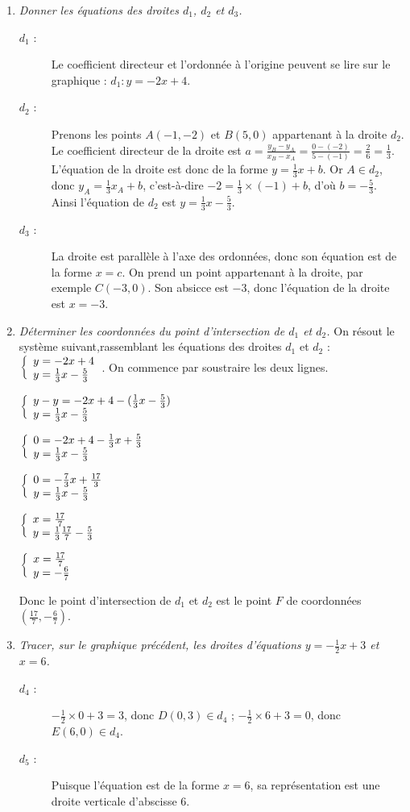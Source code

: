 \documentclass[11pt]{article}
\begin{document}
\begin{exercice}
  \begin{enumerate} 
    \item \emph{Donner les équations des droites $d_1$, $d_2$ et $d_3$. }
      \begin{description}
        \item[$d_1$ :] Le coefficient directeur et l'ordonnée à l'origine peuvent se lire sur le graphique : $d_1:y=-2x+4$.
        \item[$d_2$ :] Prenons les points $A(-1,-2)$ et $B(5,0)$ appartenant à la droite $d_2$. Le coefficient directeur de la droite est $a=\frac{y_B-y_A}{x_B-x_A}=\frac{0-(-2)}{5-(-1)}=\frac{2}{6}=\frac{1}{3}$. L'équation de la droite est donc de la forme $y=\frac{1}{3}x+b$. Or $A\in d_2$, donc $y_A=\frac{1}{3}x_A+b$, c'est-à-dire $-2=\frac{1}{3}\times(-1)+b$, d'où $b=-\frac{5}{3}$. Ainsi l'équation de $d_2$ est $y=\frac{1}{3}x-\frac{5}{3}$.
        \item[$d_3$ :] La droite est parallèle à l'axe des ordonnées, donc son équation est de la forme $x=c$. On prend un point appartenant à la droite, par exemple $C(-3,0)$. Son absicce est $-3$, donc l'équation de la droite est $x=-3$.
      \end{description}
    \item \emph{Déterminer les coordonnées du point d'intersection de $d_1$ et $d_2$. }
      On résout le système suivant,rassemblant les équations des droites $d_1$ et $d_2$ : $\left\{\begin{array}{l}y=-2x+4\\y=\frac{1}{3}x-\frac{5}{3}\end{array}\right.$. On commence par soustraire les deux lignes.
      \setlength{\columnsep}{2cm}
      \begin{multicols}{2}
        $\left\{\begin{array}{l}y-y=-2x+4-(\frac{1}{3}x-\frac{5}{3})\\y=\frac{1}{3}x-\frac{5}{3}\end{array}\right.$

        $\left\{\begin{array}{l}0=-2x+4-\frac{1}{3}x+\frac{5}{3}\\y=\frac{1}{3}x-\frac{5}{3}\end{array}\right.$

        $\left\{\begin{array}{l}0=-\frac{7}{3}x+\frac{17}{3}\\y=\frac{1}{3}x-\frac{5}{3}\end{array}\right.$

        $\left\{\begin{array}{l}x=\frac{17}{7}\\y=\frac{1}{3}\frac{17}{7}-\frac{5}{3}\end{array}\right.$

        $\left\{\begin{array}{l}x=\frac{17}{7}\\y=-\frac{6}{7}\end{array}\right.$

        Donc le point d'intersection de $d_1$ et $d_2$ est le point $F$ de coordonnées $\left(\frac{17}{7},-\frac{6}{7}\right)$.
      \end{multicols}
    \item \emph{Tracer, sur le graphique précédent,
      les droites d'équations $y = -\frac{1}{2}x+3$ et $x = 6$. }
      \begin{description}
        \item[$d_4$ :] $-\frac{1}{2}\times0+3=3$, donc $D(0,3)\in d_4$ ; $-\frac{1}{2}\times6+3=0$, donc $E(6,0)\in d_4$.
        \item[$d_5$ :] Puisque l'équation est de la forme $x=6$, sa représentation est une droite verticale d'abscisse $6$.
      \end{description}
  \end{enumerate}
\end{exercice}
\end{document}
